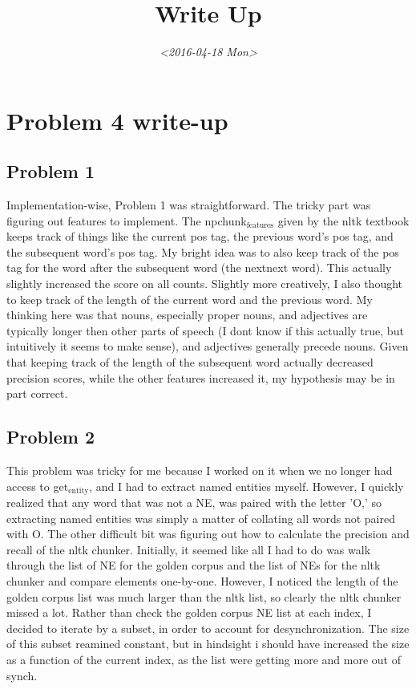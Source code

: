 \documentclass[11pt]{article}
\date{\textit{<2016-04-18 Mon>}}
\title{Write Up}
\begin{document}
\section{Problem 4 write-up}
\label{sec:orgheadline4}

\subsection{Problem 1}
\label{sec:orgheadline1}

Implementation-wise, Problem 1 was straightforward. The tricky part was figuring out features to implement. The npchunk\(_{\text{features}}\) given by the nltk textbook keeps track of things like the current pos tag, the previous word's pos tag, and the subsequent word's pos tag. My bright idea was to also keep track of the pos tag for the word after the subsequent word (the nextnext word). This actually slightly increased the score on all counts. Slightly more creatively, I also thought to keep track of the length of the current word and the previous word. My thinking here was that nouns, especially proper nouns, and adjectives are typically longer then other parts of speech (I dont know if this actually true, but intuitively it seems to make sense), and adjectives generally precede nouns. Given that keeping track of the length of the subsequent word actually decreased precision scores, while the other features increased it, my hypothesis may be in part correct.

\subsection{Problem 2}
\label{sec:orgheadline2}

This problem was tricky for me because I worked on it when we no longer had access to get\(_{\text{entity}}\), and I had to extract named entities myself. However, I quickly realized that any word that was not a NE, was paired with the letter 'O,' so extracting named entities was simply a matter of collating all words not paired with O. The other difficult bit was figuring out how to calculate the precision and recall of the nltk chunker. Initially, it seemed like all I had to do was walk through the list of NE for the golden corpus and the list of NEs for the nltk chunker and compare elements one-by-one. However, I noticed the length of the golden corpus list was much larger than the nltk list, so clearly the nltk chunker missed a lot. Rather than check the golden corpus NE list at each index, I decided to iterate by a subset, in order to account for desynchronization.  The size of this subset reamined constant, but in hindsight i should have increased the size as a function of the current index, as the list were getting more and more out of synch.
\end{document}
